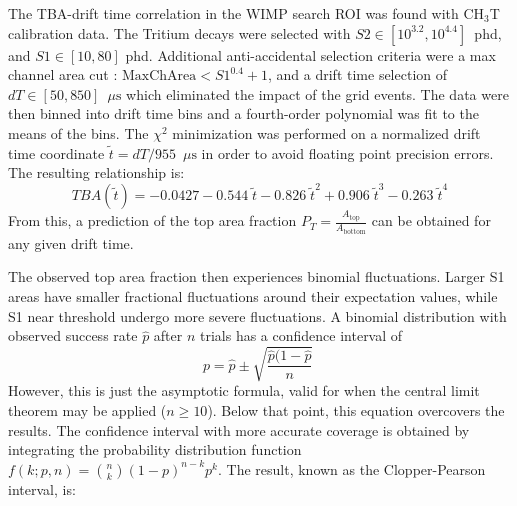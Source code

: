The TBA-drift time correlation in the WIMP search ROI was found with CH$_3$T calibration data. 
The Tritium decays were selected with $S2 \in [10^{3.2},10^{4.4}]$~phd, and $S1 
\in [10, 80]$ phd.
Additional anti-accidental selection criteria were a max channel area cut : $\text{MaxChArea} < S1^{0.4} +1$, and a drift time selection of $dT \in [50,850]$~$\mu \mathrm{s}$ which eliminated the impact of the grid events.
The data were then binned into drift time bins and a fourth-order polynomial was fit to the means of the bins.
The $\chi^2$ minimization was performed on a normalized drift time coordinate $\tilde{t} = dT / 955$~$\mu \mathrm{s}$ in order to avoid floating point precision errors.
The resulting relationship is:
\begin{equation}
  TBA(\tilde{t}) = -0.0427  -0.544\;\tilde{t} -0.826\;\tilde{t}^2  + 0.906\;\tilde{t}^3 -0.263\; \tilde{t}^4
\end{equation}
\noindent
From this, a prediction of the top area fraction $P_T  =\frac{A_{\text{top}}}{A_{\text{bottom}}} $ can be obtained for any given drift time.

The observed top area fraction then experiences binomial fluctuations. 
Larger S1 areas have smaller fractional fluctuations around their expectation values, while S1 near threshold undergo more severe fluctuations.
A binomial distribution with observed success rate $\hat{p}$ after $n$ trials has a confidence interval of
\begin{equation}
    p = \hat{p} \pm \sqrt{\frac{\hat{p} (1-\hat{p}}{n}}\;
\end{equation}
\noindent
However, this is just the asymptotic formula, valid for when the central limit theorem may be applied ($n \geq 10$). 
Below that point, this equation overcovers the results\cite{sakakibara_comparison_2014}.
The confidence interval with more accurate coverage is obtained by integrating the probability distribution function $f(k;p,n) =  \genfrac(){0pt}{}{n}{k} (1-p)^{n-k} p^k$.
The result, known as the Clopper-Pearson interval, is:

